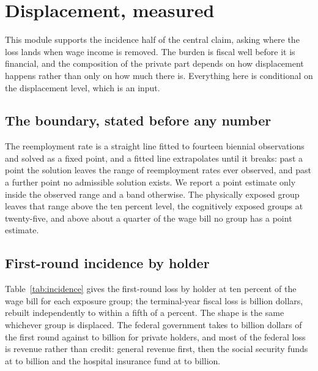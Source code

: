\section{Displacement, measured}
\label{sec:displacement}

This module supports the incidence half of the central claim, asking where the loss lands when
wage income is removed. The burden is fiscal well before it is financial, and the composition of
the private part depends on how displacement happens rather than only on how much there is.
Everything here is conditional on the displacement level, which is an input.

\subsection{The boundary, stated before any number}

The reemployment rate is a straight line fitted to fourteen biennial observations and solved as a
fixed point, and a fitted line extrapolates until it breaks: past a point the solution leaves the
range of reemployment rates ever observed, and past a further point no admissible solution
exists. We report a point estimate only inside the observed range and a band otherwise. The
physically exposed group leaves that range above the ten percent level, the cognitively exposed
groups at twenty-five, and above about a quarter of the wage bill no group has a point
estimate.

\subsection{First-round incidence by holder}

Table~\ref{tab:incidence} gives the first-round loss by holder at ten percent of the wage bill
for each exposure group; the terminal-year fiscal loss is  billion
dollars, rebuilt independently to within a fifth of a percent. The shape is the same whichever
group is displaced. The federal government takes  to
 billion dollars of the first round against
 to  billion for private
holders, and most of the federal loss is revenue rather than credit: general revenue first, then
the social security funds at  to  billion and
the hospital insurance fund at  to  billion.

